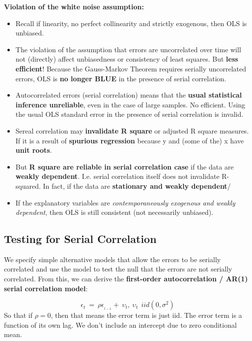 \documentclass[12pt]{article}
\begin{document}
\noindent
{\color{DarkOrchid}
\textbf{Violation of the white noise assumption:}}
\begin{itemize}
\item
Recall if linearity, no perfect collinearity and strictly exogenous, then OLS is unbiased.
\item
The violation of the assumption that errors are uncorrelated over time will not (directly) affect unbiasedness or consistency of least squares. But \textbf{less efficient}! Because the Gauss-Markov Theorem requires serially uncorrelated errors, OLS is \textbf{no longer BLUE} in the presence of serial correlation.
\item 
Autocorrelated errors (serial correlation) means that the \textbf{usual statistical inference unreliable}, even in the case of large samples. No efficient. Using the usual OLS standard error in the presence of serial correlation is invalid.
\item
Sereal correlation may \textbf{invalidate R square} or adjusted R square measures. If it is a result of \textbf{spurious regression} because y and
(some of the) x have \textbf{unit roots}.
\item
But \textbf{R square are reliable in serial correlation case} if the data are \textbf{weakly dependent}.
I.e. serial correlation itself does not invalidate R-squared. In fact, if the data are \textbf{stationary and weakly dependent}/

\item
If the explanatory variables are \textit{contemporaneously exogenous and weakly dependent}, then OLS is still consistent (not necessarily unbiased).
\end{itemize}

{\color{RoyalBlue}
\subsection{Testing for Serial Correlation}}

We specify simple alternative models that allow the errors to be serially correlated and use the model to test the null that the errors are not serially correlated. From this, we can derive the \textbf{first-order autocorrelation / AR(1) serial correlation model}:

\begin{equation}
\epsilon_t\ =\ \rho\epsilon_{_{t-1}}+\ \upsilon_t,\ \upsilon_t \ \ iid (0,\sigma^2)
\end{equation}
\noindent
So that if $\rho = 0 $, then that means the error term is just iid. The error term is a function of its own lag. We don’t include an intercept due to zero conditional mean. \\
\end{document}
